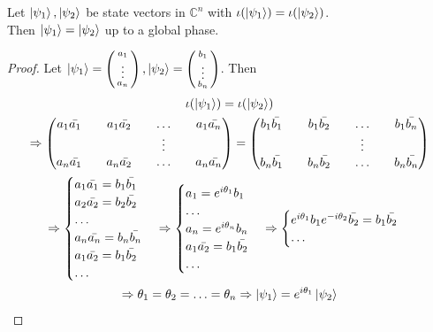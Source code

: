 

\begin{lemma}
\label{lemma state into density}
Let $\ket{\psi_1}, \ket{\psi_2}$ be state vectors in ${\mathbb{C}}^n$ with $\iota({\ket{\psi_1}})=\iota(\ket{\psi_2})$.\\
Then $\ket{\psi_1}=\ket{\psi_2}$ up to a global phase.
\end{lemma}
\begin{proof}
Let $\ket{\psi_1}=\left(\begin{smallmatrix}a_1\\ \vdots \\ a_n\end{smallmatrix}\right), \ket{\psi_2}=\left(\begin{smallmatrix}b_1\\ \vdots \\ b_n\end{smallmatrix}\right)$. Then
\begin{gather}
\iota({\ket{\psi_1}})=\iota(\ket{\psi_2})\\
\Rightarrow \begin{pmatrix}
a_1 \Bar{a_1} && a_1 \Bar{a_2} && \hdots && a_1 \Bar{a_n}\\
&& && \vdots && \\
a_n \Bar{a_1} && a_n \Bar{a_2} && \hdots && a_n \Bar{a_n}\\              
\end{pmatrix}=\begin{pmatrix}
b_1 \Bar{b_1} && b_1 \Bar{b_2} && \hdots && b_1 \Bar{b_n}\\
&& && \vdots && \\
b_n \Bar{b_1} && b_n \Bar{b_2} && \hdots && b_n \Bar{b_n}\\ 
\end{pmatrix}\\
\Rightarrow 
\begin{cases}
a_1 \Bar{a_1}=b_1 \Bar{b_1}\\
a_2 \Bar{a_2}=b_2 \Bar{b_2}\\
\hdots\\
a_n \Bar{a_n}=b_n \Bar{b_n}\\
a_1 \Bar{a_2}=b_1 \Bar{b_2}\\
\hdots
\end{cases}
\Rightarrow \begin{cases}
a_1 = e^{i\theta_1}b_1\\
\hdots\\
a_n = e^{i\theta_n}b_n\\
a_1 \Bar{a_2}=b_1 \Bar{b_2}\\
\hdots
\end{cases}
\Rightarrow \begin{cases}
e^{i\theta_1}b_1 e^{-i\theta_2}\Bar{b_2}=b_1 \Bar{b_2}\\
\hdots\\
\end{cases}\\
\Rightarrow \theta_1 = \theta_2 = \hdots = \theta_n
\Rightarrow\ket{\psi_1}=e^{i\theta_1}\ket{\psi_2}
\end{gather}
\end{proof}



